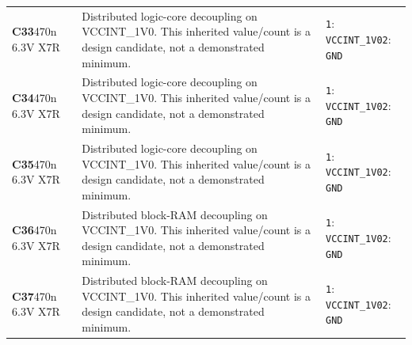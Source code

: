 \documentclass[11pt,a4paper]{article}
\begin{document}
\begin{longtable}{@{}P{27mm}P{84mm}P{57mm}@{}}
\textbf{C33}\newline 470n 6.3V X7R & Distributed logic-core decoupling on VCCINT\_1V0. This inherited value/count is a design candidate, not a demonstrated minimum. & \nolinkurl{1}: \nolinkurl{VCCINT_1V0}\newline \nolinkurl{2}: \nolinkurl{GND} \\
\textbf{C34}\newline 470n 6.3V X7R & Distributed logic-core decoupling on VCCINT\_1V0. This inherited value/count is a design candidate, not a demonstrated minimum. & \nolinkurl{1}: \nolinkurl{VCCINT_1V0}\newline \nolinkurl{2}: \nolinkurl{GND} \\
\textbf{C35}\newline 470n 6.3V X7R & Distributed logic-core decoupling on VCCINT\_1V0. This inherited value/count is a design candidate, not a demonstrated minimum. & \nolinkurl{1}: \nolinkurl{VCCINT_1V0}\newline \nolinkurl{2}: \nolinkurl{GND} \\
\textbf{C36}\newline 470n 6.3V X7R & Distributed block-RAM decoupling on VCCINT\_1V0. This inherited value/count is a design candidate, not a demonstrated minimum. & \nolinkurl{1}: \nolinkurl{VCCINT_1V0}\newline \nolinkurl{2}: \nolinkurl{GND} \\
\textbf{C37}\newline 470n 6.3V X7R & Distributed block-RAM decoupling on VCCINT\_1V0. This inherited value/count is a design candidate, not a demonstrated minimum. & \nolinkurl{1}: \nolinkurl{VCCINT_1V0}\newline \nolinkurl{2}: \nolinkurl{GND} \\

\end{longtable}
\end{document}
